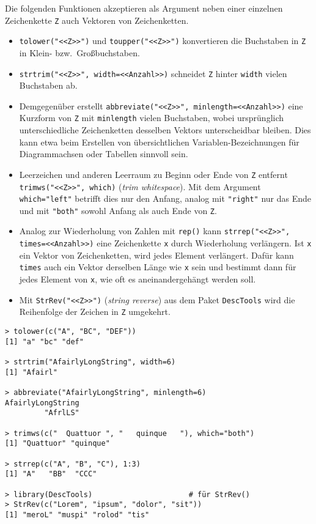 Die folgenden Funktionen akzeptieren als Argument neben einer einzelnen Zeichenkette \lstinline!Z! auch Vektoren von Zeichenketten.
\begin{itemize}
\item \lstinline!tolower("<<Z>>")! und \lstinline!toupper("<<Z>>")! konvertieren die Buchstaben in \lstinline!Z! in Klein- bzw.\ Großbuchstaben.
\item \lstinline!strtrim("<<Z>>", width=<<Anzahl>>)! schneidet \lstinline!Z! hinter \lstinline!width! vielen Buchstaben ab.
\item Demgegenüber erstellt \lstinline!abbreviate("<<Z>>", minlength=<<Anzahl>>)! eine Kurzform von \lstinline!Z! mit \lstinline!minlength! vielen Buchstaben, wobei ursprünglich unterschiedliche Zeichenketten desselben Vektors unterscheidbar bleiben. Dies kann etwa beim Erstellen von übersichtlichen Variablen-Bezeichnungen für Diagrammachsen oder Tabellen sinnvoll sein.
\item Leerzeichen und anderen Leerraum zu Beginn oder Ende von \lstinline!Z! entfernt \lstinline!trimws("<<Z>>", which)! (\emph{trim whitespace}). Mit dem Argument \lstinline!which="left"! betrifft dies nur den Anfang, analog mit \lstinline!"right"! nur das Ende und mit \lstinline!"both"! sowohl Anfang als auch Ende von \lstinline!Z!.
\item Analog zur Wiederholung von Zahlen mit \lstinline!rep()! kann \lstinline!strrep("<<Z>>", times=<<Anzahl>>)! eine Zeichenkette \lstinline!x! durch Wiederholung verlängern. Ist \lstinline!x! ein Vektor von Zeichenketten, wird jedes Element verlängert. Dafür kann \lstinline!times! auch ein Vektor derselben Länge wie \lstinline!x! sein und bestimmt dann für jedes Element von \lstinline!x!, wie oft es aneinandergehängt werden soll.
\item Mit \lstinline!StrRev("<<Z>>")! (\emph{string reverse}) aus dem Paket \lstinline!DescTools! wird die Reihenfolge der Zeichen in \lstinline!Z! umgekehrt.
\end{itemize}
\begin{lstlisting}
> tolower(c("A", "BC", "DEF"))
[1] "a" "bc" "def"

> strtrim("AfairlyLongString", width=6)
[1] "Afairl"

> abbreviate("AfairlyLongString", minlength=6)
AfairlyLongString
         "AfrlLS"

> trimws(c("  Quattuor ", "   quinque   "), which="both")
[1] "Quattuor" "quinque"

> strrep(c("A", "B", "C"), 1:3)
[1] "A"   "BB"  "CCC"

> library(DescTools)                      # für StrRev()
> StrRev(c("Lorem", "ipsum", "dolor", "sit"))
[1] "meroL" "muspi" "rolod" "tis"
\end{lstlisting}

